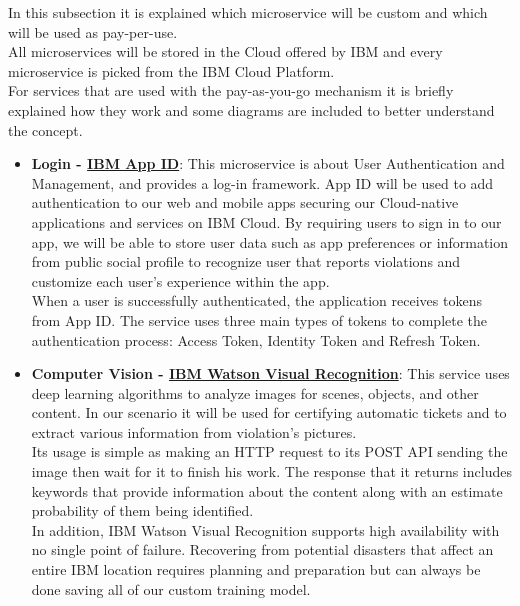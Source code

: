In this subsection it is explained which microservice will be custom and which will be used as pay-per-use. 
\\All microservices will be stored in the Cloud offered by IBM and every microservice is picked from the IBM Cloud Platform.
\\For services that are used with the pay-as-you-go mechanism it is briefly explained how they work and some diagrams are included to better understand the concept.
\begin{itemize}
	\item \textbf{Login - \href{https://cloud.ibm.com/catalog/services/app-id}{IBM App ID}}: \hypertarget{appid}{} This microservice is about User Authentication and Management, and provides a log-in framework. App ID will be used to add authentication to our web and mobile apps securing our Cloud-native applications and services on IBM Cloud. By requiring users to sign in to our app, we will be able to store user data such as app preferences or information from public social profile to recognize user that reports violations and customize each user's experience within the app.
	\\When a user is successfully authenticated, the application receives tokens from App ID. The service uses three main types of tokens to complete the authentication process: Access Token, Identity Token and Refresh Token.

	\item \textbf{Computer Vision - \href{https://cloud.ibm.com/catalog/services/visual-recognition}{IBM Watson Visual Recognition}}: \hypertarget{watson}{} This service uses deep learning algorithms to analyze images for scenes, objects, and other content. In our scenario it will be used for certifying automatic tickets and to extract various information from violation's pictures.
	\\Its usage is simple as making an HTTP request to its POST API sending the image then wait for it to finish his work. The response that it returns includes keywords that provide information about the content along with an estimate probability of them being identified.
	\\In addition, IBM Watson Visual Recognition supports high availability with no single point of failure. Recovering from potential disasters that affect an entire IBM location requires planning and preparation but can always be done saving all of our custom training model.
	

\end{itemize}

